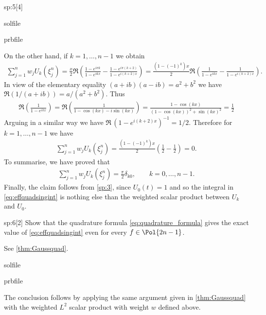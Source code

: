 \begin{samproblem}
\begin{subproblem}{sp:5}[4]
\begin{samwriteprbpart}{solfile}
\begin{writeverbatim}{prbfile}
\begin{samsolution}
        On the other hand, if $k=1,\dots,n-1$ we obtain
        \begin{align*}
          \sum_{j=1}^n w_j U_k(\xi^n_j) =  \frac{x}{2}\Re\left( \frac{1-e^{i\pi k}}{1-e^{i k x}}-
          \frac{1-e^{i\pi(k+2)}}{1-e^{i (k+2) x }}\right) =  \frac{(1-(-1)^k)x}{2}\Re\left( \frac{1}{1-e^{i k x}}-\frac{1}{1-e^{i (k+2) x}}\right).
        \end{align*}
        In view of the elementary equality $(a+ib)(a-ib)=a^2+b^2$ we have $\Re(1/(a+ib)) = a/(a^2+b^2)$. Thus
        \begin{align*}
          \Re\left( \frac{1}{1-e^{i k x}}\right) = \Re\left( \frac{1}{1-\cos(kx)-i\sin(kx)} \right)
          = \frac{1-\cos(kx)}{(1-\cos(kx))^2 + \sin(kx)^2}  = \frac{1}{2}
        \end{align*}
        Arguing in a similar way we have $\Re\,(1-e^{i (k+2) x})^{-1}= 1/2$. Therefore for $k=1,\dots,n-1$ we have
        \begin{align*}
          \sum_{j=1}^n w_j U_k(\xi^n_j) = \frac{(1-(-1)^k)x}{2}\left( \frac{1}{2} -\frac{1}{2} \right) = 0.
        \end{align*}
        To summarise, we have proved that
        \begin{align*}
          \sum_{j=1}^n w_j U_k(\xi^n_j) = \frac{\pi}{2}\delta_{k0},\qquad k=0,\dots,n-1.
        \end{align*}
        Finally, the claim follows from \ref{sp:3}, since $U_0(t)=1$ and so the integral in  \eqref{eq:effquadsingint} 
        is nothing else than the weighted scalar product between $U_k$ and $U_0$.     
      \end{samsolution}
    \end{writeverbatim}
  \end{samwriteprbpart}

\end{subproblem}

\begin{subproblem}{sp:6}[2]
  Show that the quadrature formula \eqref{eq:quadrature_formula} gives the exact value of \eqref{eq:effquadsingint}  even for every $f\in \Pol{2n-1}$.
  \begin{samhint}
    See \cref{thm:Gaussquad}.
  \end{samhint}
  \begin{samwriteprbpart}{solfile}
    \begin{writeverbatim}{prbfile}
      \begin{samsolution}
        The conclusion follows by applying the same argument given in \cref{thm:Gaussquad} with the weighted $L^2$ scalar 
        product with weight $w$ defined above.
     \end{samsolution}
    \end{writeverbatim}
  \end{samwriteprbpart}


\end{subproblem}
\end{samproblem}
